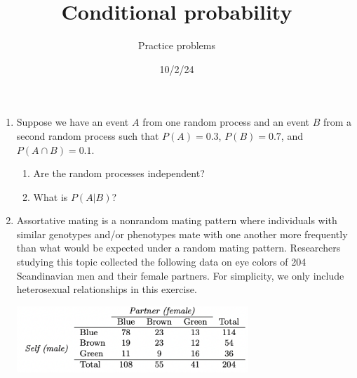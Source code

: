 \documentclass[
  letterpaper,
  DIV=11,
  numbers=noendperiod]{scrartcl}
\title{Conditional probability}
\author{Practice problems}
\date{10/2/24}
\providecommand{\tightlist}{%
  \setlength{\itemsep}{0pt}\setlength{\parskip}{0pt}}\usepackage{longtable,booktabs,array}
\begin{document}
\maketitle
\ifdefined\Shaded\renewenvironment{Shaded}{\begin{tcolorbox}[boxrule=0pt, sharp corners, interior hidden, frame hidden, borderline west={3pt}{0pt}{shadecolor}, breakable, enhanced]}{\end{tcolorbox}}\fi

\begin{enumerate}
\def\labelenumi{\arabic{enumi}.}
\item
  Suppose we have an event \(A\) from one random process and an event
  \(B\) from a second random process such that \(P(A) = 0.3\),
  \(P(B) = 0.7\), and \(P(A \cap B) = 0.1\).

  \begin{enumerate}
  \def\labelenumii{\alph{enumii}.}
  \tightlist
  \item
    Are the random processes independent?
  \item
    What is \(P(A|B)\)?
  \end{enumerate}
\item
  Assortative mating is a nonrandom mating pattern where individuals
  with similar genotypes and/or phenotypes mate with one another more
  frequently than what would be expected under a random mating pattern.
  Researchers studying this topic collected the following data on eye
  colors of 204 Scandinavian men and their female partners. For
  simplicity, we only include heterosexual relationships in this
  exercise.

  \includegraphics[width=3.4375in,height=\textheight]{../practice_probs/figs/09-eyes.png}


\end{enumerate}
\end{document}
